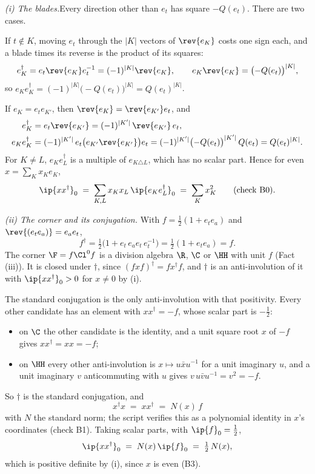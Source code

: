 \textit{(i) The blades.}\enspace Every direction other than $e_{t}$ has square $-Q(e_{t})$. There are two cases.

If $t \notin K$, moving $e_{t}$ through the $|K|$ vectors of $\rev{e_{K}}$ costs one sign each, and a blade times its reverse is the product of its squares:
\[
e_{K}^{\dagger} = e_{t}\rev{e_{K}}e_{t}^{-1} = (-1)^{|K|}\rev{e_{K}}, \qquad e_{K}\rev{e_{K}} = \bigl(-Q(e_{t})\bigr)^{|K|},
\]
so $e_{K}e_{K}^{\dagger} = (-1)^{|K|}\bigl(-Q(e_{t})\bigr)^{|K|} = Q(e_{t})^{|K|}$.

If $e_{K} = e_{t}e_{K'}$, then $\rev{e_{K}} = \rev{e_{K'}}e_{t}$, and
\begin{align*}
e_{K}^{\dagger} &= e_{t}\rev{e_{K'}} = (-1)^{|K'|}\,\rev{e_{K'}}\,e_{t}, \\
e_{K}e_{K}^{\dagger} &= (-1)^{|K'|}\,e_{t}\bigl(e_{K'}\rev{e_{K'}}\bigr)e_{t} = (-1)^{|K'|}\bigl(-Q(e_{t})\bigr)^{|K'|}\,Q(e_{t}) = Q(e_{t})^{|K|}.
\end{align*}
For $K \neq L$, $e_{K}e_{L}^{\dagger}$ is a multiple of $e_{K \triangle L}$, which has no scalar part. Hence for even $x = \sum_{K}x_{K}e_{K}$,
\[
\ip{xx^{\dagger}}_{0} \;=\; \sum_{K,L}x_{K}x_{L}\,\ip{e_{K}e_{L}^{\dagger}}_{0} \;=\; \sum_{K}x_{K}^{2} \qquad \text{(check B0)}.
\]



\emph{(ii) The corner and its conjugation.}  With $f = \tfrac{1}{2}(1 + e_{t}e_{a})$ and $\rev{(e_{t}e_{a})} = e_{a}e_{t}$,
\[
f^{\dagger} = \tfrac{1}{2}\bigl(1 + e_{t}\,e_{a}e_{t}\,e_{t}^{-1}\bigr) = \tfrac{1}{2}(1 + e_{t}e_{a}) = f.
\]
The corner $\F = f\Cl^{0}f$ is a division algebra $\R$, $\C$ or $\HH$ with unit $f$ (Fact (iii)). It is closed under $\dagger$, since $(fxf)^{\dagger} = fx^{\dagger}f$, and $\dagger$ is an anti-involution of it with $\ip{xx^{\dagger}}_{0} > 0$ for $x \neq 0$ by (i).

The standard conjugation is the only anti-involution with that positivity. Every other candidate has an element with $xx^{\dagger} = -f$, whose scalar part is $-\tfrac{1}{2}$:
\begin{itemize}
\item on $\C$ the other candidate is the identity, and a unit square root $x$ of $-f$ gives $xx^{\dagger} = xx = -f$;
\item on $\HH$ every other anti-involution is $x \mapsto u\bar{x}u^{-1}$ for a unit imaginary $u$, and a unit imaginary $v$ anticommuting with $u$ gives $v\,u\bar{v}u^{-1} = v^{2} = -f$.
\end{itemize}
So $\dagger$ is the standard conjugation, and
\[
x^{\dagger}x \;=\; xx^{\dagger} \;=\; N(x)\,f
\]
with $N$ the standard norm; the script verifies this as a polynomial identity in $x$'s coordinates (check B1). Taking scalar parts, with $\ip{f}_{0} = \tfrac{1}{2}$,
\[
\ip{xx^{\dagger}}_{0} \;=\; N(x)\,\ip{f}_{0} \;=\; \tfrac{1}{2}\,N(x),
\]
which is positive definite by (i), since $x$ is even (B3).



